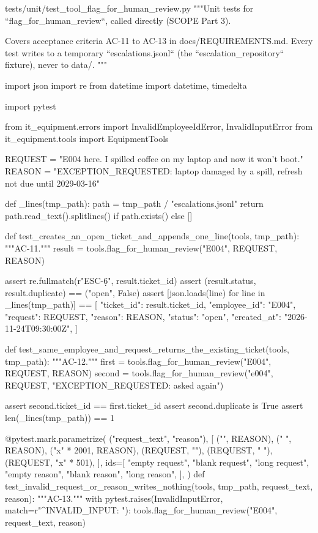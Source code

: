 \documentclass[11pt,letterpaper]{article}
\renewcommand{\_}{\textunderscore\allowbreak}
\begin{document}
\begin{codebox}{tests/unit/test_tool_flag_for_human_review.py}
"""Unit tests for ``flag_for_human_review``, called directly (SCOPE Part 3).

Covers acceptance criteria AC-11 to AC-13 in docs/REQUIREMENTS.md. Every test writes to a
temporary ``escalations.jsonl`` (the ``escalation_repository`` fixture), never to data/.
"""

import json
import re
from datetime import datetime, timedelta

import pytest

from it_equipment.errors import InvalidEmployeeIdError, InvalidInputError
from it_equipment.tools import EquipmentTools

REQUEST = "E004 here. I spilled coffee on my laptop and now it won't boot."
REASON = "EXCEPTION_REQUESTED: laptop damaged by a spill, refresh not due until 2029-03-16"


def _lines(tmp_path):
    path = tmp_path / "escalations.jsonl"
    return path.read_text().splitlines() if path.exists() else []


def test_creates_an_open_ticket_and_appends_one_line(tools, tmp_path):
    """AC-11."""
    result = tools.flag_for_human_review("E004", REQUEST, REASON)

    assert re.fullmatch(r"ESC-\d{6}", result.ticket_id)
    assert (result.status, result.duplicate) == ("open", False)
    assert [json.loads(line) for line in _lines(tmp_path)] == [
        {
            "ticket_id": result.ticket_id,
            "employee_id": "E004",
            "request": REQUEST,
            "reason": REASON,
            "status": "open",
            "created_at": "2026-11-24T09:30:00Z",
        }
    ]


def test_same_employee_and_request_returns_the_existing_ticket(tools, tmp_path):
    """AC-12."""
    first = tools.flag_for_human_review("E004", REQUEST, REASON)
    second = tools.flag_for_human_review("e004", REQUEST, "EXCEPTION_REQUESTED: asked again")

    assert second.ticket_id == first.ticket_id
    assert second.duplicate is True
    assert len(_lines(tmp_path)) == 1


@pytest.mark.parametrize(
    ("request_text", "reason"),
    [
        ("", REASON),
        ("   ", REASON),
        ("x" * 2001, REASON),
        (REQUEST, ""),
        (REQUEST, "   "),
        (REQUEST, "x" * 501),
    ],
    ids=[
        "empty request",
        "blank request",
        "long request",
        "empty reason",
        "blank reason",
        "long reason",
    ],
)
def test_invalid_request_or_reason_writes_nothing(tools, tmp_path, request_text, reason):
    """AC-13."""
    with pytest.raises(InvalidInputError, match=r"^INVALID_INPUT: "):
        tools.flag_for_human_review("E004", request_text, reason)


\end{codebox}
\end{document}

